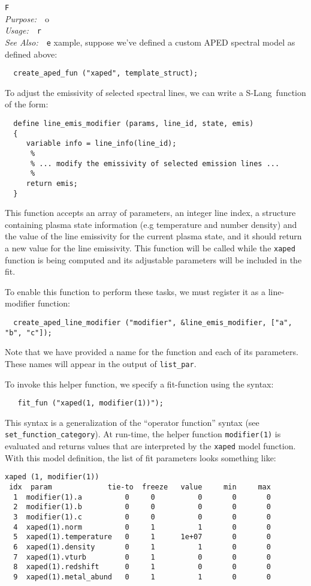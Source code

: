 \documentclass{book}
\makeatletter
\newif\ifpdf
\newcommand{\slang}{{\sc S-Lang}}
\newenvironment{isisfunction}[4]%
{\index{{#1}@{\tt #1}}%
  \ifpdf
  \else
     \addcontentsline{toc}{subsection}{{#1} -- {#2}}
  \fi
  \vbox{
          \vspace*{\baselineskip}
          {\LARGE\tt #1}\vspace*{\baselineskip}\\
          {{\it Purpose:}~~{#2}}\\
          {{\it Usage:}~~{\tt #3}}\\
          {{\it See Also:}~~{\tt #4}}
       }
}%
{ }
\makeatother
\begin{document}
{\begin{isisfunction}
For example, suppose we've defined a custom APED spectral model
as defined above:
\begin{verbatim}
  create_aped_fun ("xaped", template_struct);
\end{verbatim}

To adjust the emissivity of selected spectral lines, we can
write a \slang\ function of the form:
\begin{verbatim}
  define line_emis_modifier (params, line_id, state, emis)
  {
     variable info = line_info(line_id);
      %
      % ... modify the emissivity of selected emission lines ...
      %
     return emis;
  }
\end{verbatim}
This function accepts an array of parameters, an integer line
index, a structure containing plasma state information (e.g
temperature and number density) and the value of the line
emissivity for the current plasma state, and it should return a
new value for the line emissivity. This function will be called
while the \verb|xaped| function is being computed and its
adjustable parameters will be included in the fit.

To enable this function to perform these tasks, we must
register it as a line-modifier function:
\begin{verbatim}
  create_aped_line_modifier ("modifier", &line_emis_modifier, ["a", "b", "c"]);
\end{verbatim}
Note that we have provided a name for the function and each of
its parameters.  These names will appear in the output of
\verb|list_par|.

To invoke this helper function, we specify a fit-function using
the syntax:
\begin{verbatim}
   fit_fun ("xaped(1, modifier(1))");
\end{verbatim}
This syntax is a generalization of the ``operator function''
syntax (see \verb|set_function_category|).  At run-time, the
helper function \verb|modifier(1)| is evaluated and returns
values that are interpreted by the \verb|xaped| model function.
With this model definition, the list of fit parameters looks
something like:
\begin{verbatim}
xaped (1, modifier(1))
 idx  param             tie-to  freeze   value     min     max
  1  modifier(1).a          0     0          0       0       0
  2  modifier(1).b          0     0          0       0       0
  3  modifier(1).c          0     0          0       0       0
  4  xaped(1).norm          0     1          1       0       0
  5  xaped(1).temperature   0     1      1e+07       0       0
  6  xaped(1).density       0     1          1       0       0
  7  xaped(1).vturb         0     1          0       0       0
  8  xaped(1).redshift      0     1          0       0       0
  9  xaped(1).metal_abund   0     1          1       0       0
\end{verbatim}


\end{isisfunction}}
\end{document}
